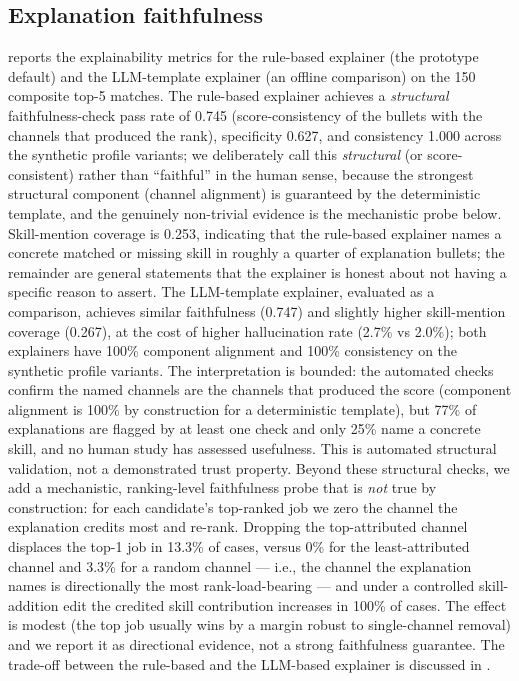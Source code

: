 \subsection{Explanation faithfulness}\label{sec:5.2}
 reports the explainability metrics for the rule-based explainer (the prototype default) and the LLM-template explainer (an offline comparison) on the 150 composite top-5 matches.
The rule-based explainer achieves a \emph{structural} faithfulness-check pass rate of 0.745 (score-consistency of the bullets with the channels that produced the rank), specificity 0.627, and consistency 1.000 across the synthetic profile variants; we deliberately call this \emph{structural} (or score-consistent) rather than ``faithful'' in the human sense, because the strongest structural component (channel alignment) is guaranteed by the deterministic template, and the genuinely non-trivial evidence is the mechanistic probe below.
Skill-mention coverage is 0.253, indicating that the rule-based explainer names a concrete matched or missing skill in roughly a quarter of explanation bullets; the remainder are general statements that the explainer is honest about not having a specific reason to assert.
The LLM-template explainer, evaluated as a comparison, achieves similar faithfulness (0.747) and slightly higher skill-mention coverage (0.267), at the cost of higher hallucination rate (2.7\% vs 2.0\%); both explainers have 100\% component alignment and 100\% consistency on the synthetic profile variants.
The interpretation is bounded: the automated checks confirm the named channels are the channels that produced the score (component alignment is 100\% by construction for a deterministic template), but 77\% of explanations are flagged by at least one check and only 25\% name a concrete skill, and no human study has assessed usefulness. This is automated structural validation, not a demonstrated trust property.
Beyond these structural checks, we add a mechanistic, ranking-level faithfulness probe that is \emph{not} true by construction: for each candidate's top-ranked job we zero the channel the explanation credits most and re-rank. Dropping the top-attributed channel displaces the top-1 job in 13.3\% of cases, versus 0\% for the least-attributed channel and 3.3\% for a random channel --- i.e., the channel the explanation names is directionally the most rank-load-bearing --- and under a controlled skill-addition edit the credited skill contribution increases in 100\% of cases. The effect is modest (the top job usually wins by a margin robust to single-channel removal) and we report it as directional evidence, not a strong faithfulness guarantee.
The trade-off between the rule-based and the LLM-based explainer is discussed in .

